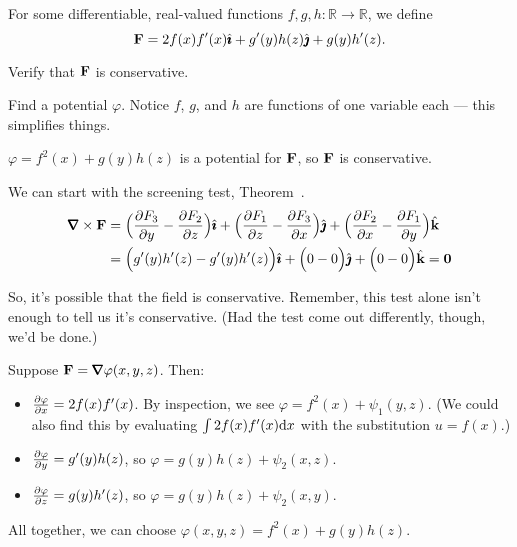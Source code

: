 \begin{question}
For some differentiable, real-valued functions $f,g,h:\mathbb R \to \mathbb R$, we define 
\[\mathbf{F}=2f(x)f'(x)\hat{\pmb{\imath}}+g'(y)h(z)\hat{\pmb{\jmath}}+g(y)h'(z).\]

Verify that $\mathbf{F}$ is conservative.

\end{question}
\begin{hint}
Find a potential $\varphi$. Notice $f$, $g$, and $h$ are functions of one variable each --- this simplifies things.
\end{hint}
\begin{answer}
$\varphi=f^2(x)+g(y)h(z)$ is a potential for $\mathbf{F}$, so $\mathbf{F}$ is conservative.
\end{answer}
\begin{solution}

We can start with the screening test, Theorem~.
\begin{align*}
\mathbf\vnabla \times \vF &=\Big(\pdiff{F_3}{y} -\pdiff{F_2}{z} \Big)\hi
+\Big(\pdiff{F_1}{z} -\pdiff{F_3}{x} \Big)\hj
+\Big(\pdiff{F_2}{x} -\pdiff{F_1}{y} \Big)\hk\\
&=\Big(g'(y)h'(z)-g'(y)h'(z) \Big)\hi
+\Big(0 -0 \Big)\hj
+\Big(0 -0 \Big)\hk=\mathbf{0}
\end{align*}

So, it's possible that the field is conservative. Remember, this test alone isn't enough to tell us it's conservative. (Had the test come out differently, though, we'd be done.)

Suppose $\vF=\vnabla\varphi(x,y,z)$. Then:
\begin{itemize}
\item $\pdiff{\varphi}{x} = 2f(x)f'(x) $. By inspection, we see $\varphi = f^2(x)+ \psi_1(y,z)$. (We could also find this by evaluating $\int 2f(x)f'(x)\mathrm{d}x$ with the substitution $u=f(x)$.)
\item $\pdiff{\varphi}{y} =  g'(y)h(z)$, so $\varphi=g(y)h(z)+\psi_2(x,z)$.
\item $\pdiff{\varphi}{z} =  g(y)h'(z)$, so $\varphi=g(y)h(z)+\psi_2(x,y)$.
\end{itemize}
All together, we can choose $\varphi(x,y,z) = f^2(x)+g(y)h(z)$.

\end{solution}


